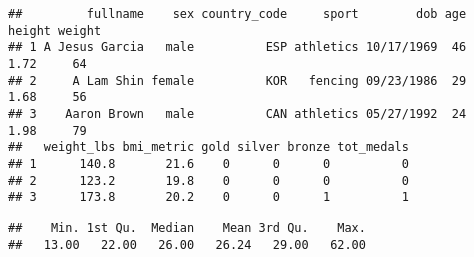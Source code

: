 \documentclass[]{article}
\newenvironment{Shaded}{\begin{snugshade}}{\end{snugshade}}
\newcommand{\CommentTok}[1]{\textcolor[rgb]{0.56,0.35,0.01}{\textit{#1}}}
\newcommand{\KeywordTok}[1]{\textcolor[rgb]{0.13,0.29,0.53}{\textbf{#1}}}
\newcommand{\NormalTok}[1]{#1}
\newcommand{\OperatorTok}[1]{\textcolor[rgb]{0.81,0.36,0.00}{\textbf{#1}}}
\begin{document}
\begin{verbatim}
##         fullname    sex country_code     sport        dob age height weight
## 1 A Jesus Garcia   male          ESP athletics 10/17/1969  46   1.72     64
## 2     A Lam Shin female          KOR   fencing 09/23/1986  29   1.68     56
## 3    Aaron Brown   male          CAN athletics 05/27/1992  24   1.98     79
##   weight_lbs bmi_metric gold silver bronze tot_medals
## 1      140.8       21.6    0      0      0          0
## 2      123.2       19.8    0      0      0          0
## 3      173.8       20.2    0      0      1          1
\end{verbatim}

\begin{Shaded}
\end{Shaded}

\begin{Shaded}
\end{Shaded}

\begin{verbatim}
##    Min. 1st Qu.  Median    Mean 3rd Qu.    Max. 
##   13.00   22.00   26.00   26.24   29.00   62.00
\end{verbatim}

\begin{Shaded}
\end{Shaded}
\end{document}
